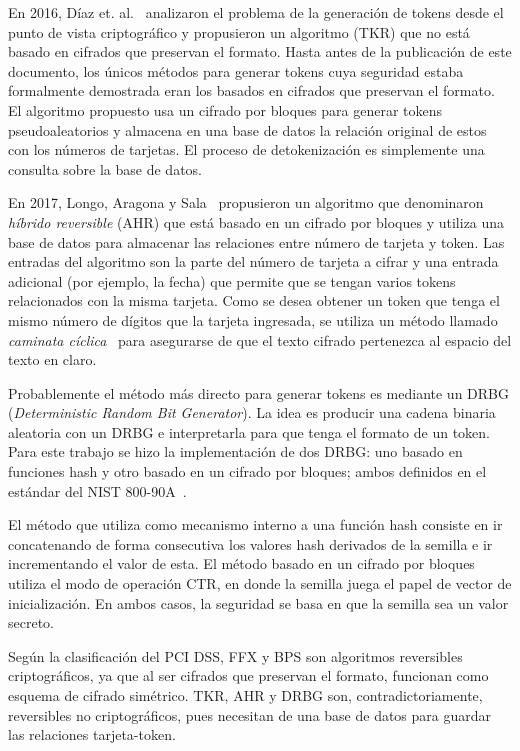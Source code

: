 \documentclass[conference]{IEEEtran}
\begin{document}
  En 2016, Díaz et. al.~\cite{doc_sandra} analizaron el problema de la
  generación de tokens desde el punto de vista criptográfico y propusieron un
  algoritmo (TKR) que no está basado en cifrados que preservan el formato. Hasta
  antes de la publicación de este documento, los únicos métodos para generar
  tokens cuya seguridad estaba formalmente demostrada eran los basados en
  cifrados que preservan el formato.  El algoritmo propuesto usa un cifrado por
  bloques para generar tokens pseudoaleatorios y almacena en una base de datos
  la relación original de estos con los números de tarjetas. El proceso de
  detokenización es simplemente una consulta sobre la base de datos.

  En 2017, Longo, Aragona y Sala~\cite{aragona} propusieron un algoritmo que
  denominaron \textit{híbrido reversible} (AHR) que está basado en un cifrado
  por bloques y utiliza una base de datos para almacenar las relaciones entre
  número de tarjeta y token. Las entradas del algoritmo son la parte del número
  de tarjeta a cifrar y una entrada adicional (por ejemplo, la fecha) que
  permite que se tengan varios tokens relacionados con la misma tarjeta. Como se
  desea obtener un token que tenga el mismo número de dígitos que la tarjeta
  ingresada, se utiliza un método llamado
  \textit{caminata cíclica}~\cite{blackrog} para asegurarse de que el texto
  cifrado pertenezca al espacio del texto en claro.

  Probablemente el método más directo para generar tokens es mediante un DRBG
  (\textit{Deterministic Random Bit Generator}). La idea es producir una cadena
  binaria aleatoria con un DRBG e interpretarla para que tenga el formato de un
  token. Para este trabajo se hizo la implementación de dos DRBG: uno basado en
  funciones hash y otro basado en un cifrado por bloques; ambos 
  definidos en el estándar del NIST 800-90A~\cite{nist_aleatorios}.

  El método que utiliza como mecanismo interno a una función hash
  consiste en ir concatenando de forma consecutiva los valores hash
  derivados de la semilla e ir incrementando el valor de esta. El método basado
  en un cifrado por bloques utiliza el modo de operación CTR, en donde la
  semilla juega el papel de vector de inicialización. En ambos casos, la
  seguridad se basa en que la semilla sea un valor secreto.

  Según la clasificación del PCI DSS, FFX y BPS son algoritmos reversibles
  criptográficos, ya que al ser cifrados que preservan el formato, funcionan
  como esquema de cifrado simétrico. TKR, AHR y DRBG son, contradictoriamente,
  reversibles no criptográficos, pues necesitan de una base de datos para
  guardar las relaciones tarjeta-token.
\end{document}
